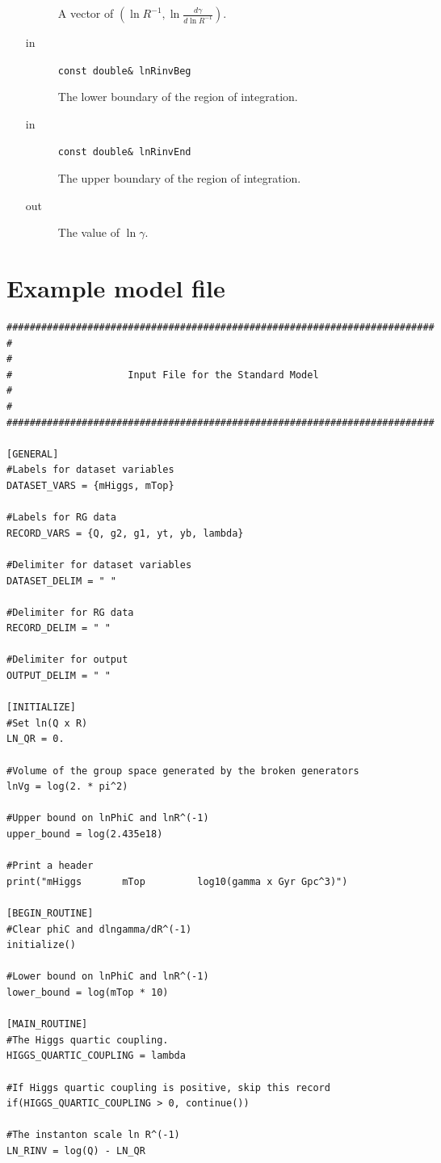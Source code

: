 \documentclass[12pt]{article}
\begin{document}
\begin{itemize}
\begin{description}
A vector of $\left(\ln R^{-1},\ln\frac{d\gamma}{d\ln R^{-1}} \right)$.
 \item[in] \verb|const double& lnRinvBeg| 

The lower boundary of the region of integration.
 \item[in] \verb|const double& lnRinvEnd| 

The upper boundary of the region of integration.
 \item[out] The value of $\ln\gamma$.
\end{description}
\end{itemize}
\appendix
\section{Example model file}
\begin{lstlisting}[basicstyle=\ttfamily\footnotesize, frame=single]
##########################################################################
#
#
#                    Input File for the Standard Model
#
#
##########################################################################

[GENERAL]
#Labels for dataset variables
DATASET_VARS = {mHiggs, mTop}

#Labels for RG data
RECORD_VARS = {Q, g2, g1, yt, yb, lambda}

#Delimiter for dataset variables
DATASET_DELIM = " "

#Delimiter for RG data
RECORD_DELIM = " "

#Delimiter for output
OUTPUT_DELIM = " "

[INITIALIZE]
#Set ln(Q x R)
LN_QR = 0.

#Volume of the group space generated by the broken generators
lnVg = log(2. * pi^2)

#Upper bound on lnPhiC and lnR^(-1)
upper_bound = log(2.435e18)

#Print a header
print("mHiggs       mTop         log10(gamma x Gyr Gpc^3)")

[BEGIN_ROUTINE]
#Clear phiC and dlngamma/dR^(-1)
initialize()

#Lower bound on lnPhiC and lnR^(-1)
lower_bound = log(mTop * 10)

[MAIN_ROUTINE]
#The Higgs quartic coupling.
HIGGS_QUARTIC_COUPLING = lambda

#If Higgs quartic coupling is positive, skip this record
if(HIGGS_QUARTIC_COUPLING > 0, continue())

#The instanton scale ln R^(-1)
LN_RINV = log(Q) - LN_QR


\end{lstlisting}
\end{document}
